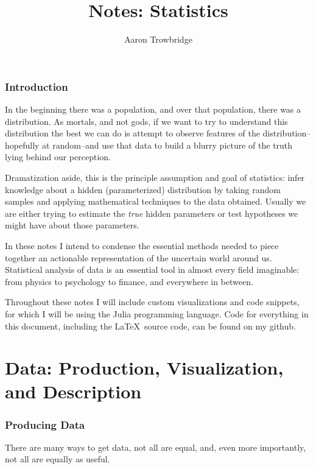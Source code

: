 \documentclass{article}
\title{Notes: Statistics}
\author{Aaron Trowbridge}
\date{}
\begin{document}
\maketitle

\tableofcontents
\newpage



\section{Introduction}

In the beginning there was a population, and over that population, there was a distribution.  As mortals, and not gods, if we want to try to understand this distribution the best we can do is attempt to observe features of the distribution--hopefully at random--and use that data to build a blurry picture of the truth lying behind our perception.  

Dramatization aside, this is the principle assumption and goal of statistics: infer knowledge about a hidden (parameterized) distribution by taking random samples and applying mathematical techniques to the data obtained. Usually we are either trying to estimate the \textit{true} hidden parameters or test hypotheses we might have about those parameters. 

In these notes I intend to condense the essential methods needed to piece together an actionable representation of the uncertain world around us.  Statistical analysis of data is an essential tool in almost every field imaginable: from physics to psychology to finance, and everywhere in between.

Throughout these notes I will include custom visualizations and code snippets, for which I will be using the Julia programming language.  Code for everything in this document, including the \LaTeX \  source code, can be found on my github. 

\newpage
\part{Data: Production, Visualization, and Description}
\section{Producing Data}

There are many ways to get data, not all are equal, and, even more importantly, not all are equally as useful.  
\end{document}
